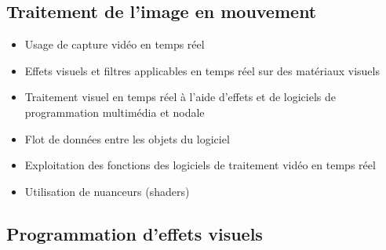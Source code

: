 \documentclass[
  french,
]{book}
\providecommand{\tightlist}{%
  \setlength{\itemsep}{0pt}\setlength{\parskip}{0pt}}
\begin{document}
\hypertarget{traitement-de-limage-en-mouvement}{%
\subsection{Traitement de l'image en mouvement}\label{traitement-de-limage-en-mouvement}}

\begin{itemize}
\tightlist
\item
  Usage de capture vidéo en temps réel\\
\item
  Effets visuels et filtres applicables en temps réel sur des matériaux visuels\\
\item
  Traitement visuel en temps réel à l'aide d'effets et de logiciels de programmation multimédia et nodale
\item
  Flot de données entre les objets du logiciel
\item
  Exploitation des fonctions des logiciels de traitement vidéo en temps réel
\item
  Utilisation de nuanceurs (shaders)
\end{itemize}

\hypertarget{programmation-deffets-visuels}{%
\subsection{Programmation d'effets visuels}\label{programmation-deffets-visuels}}
\end{document}
